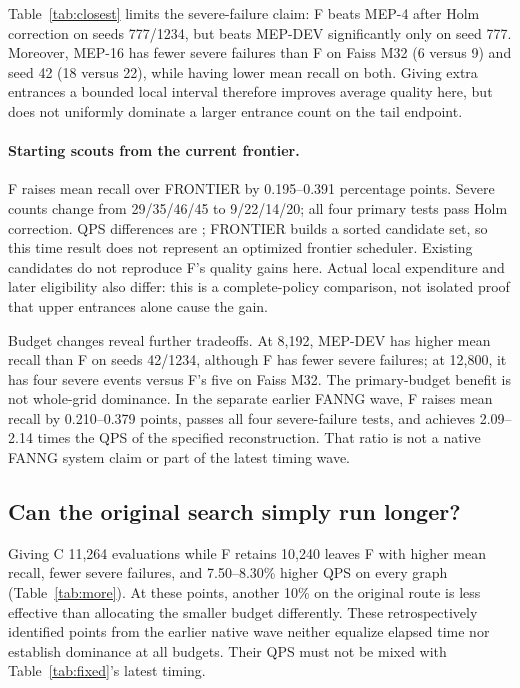 

Table~\ref{tab:closest} limits the severe-failure claim: F beats MEP-4 after Holm correction on seeds 777/1234, but beats MEP-DEV significantly only on seed 777. Moreover, MEP-16 has fewer severe failures than F on Faiss M32 (6 versus 9) and seed 42 (18 versus 22), while having lower mean recall on both. Giving extra entrances a bounded local interval therefore improves average quality here, but does not uniformly dominate a larger entrance count on the tail endpoint.

\paragraph{Starting scouts from the current frontier.}
F raises mean recall over FRONTIER by 0.195--0.391 percentage points. Severe counts change from 29/35/46/45 to 9/22/14/20; all four primary tests pass Holm correction. QPS differences are \rTwoQpsFrontier{}; FRONTIER builds a sorted candidate set, so this time result does not represent an optimized frontier scheduler. Existing candidates do not reproduce F's quality gains here. Actual local expenditure and later eligibility also differ: this is a complete-policy comparison, not isolated proof that upper entrances alone cause the gain.

Budget changes reveal further tradeoffs. At 8,192, MEP-DEV has higher mean recall than F on seeds 42/1234, although F has fewer severe failures; at 12,800, it has four severe events versus F's five on Faiss M32. The primary-budget benefit is not whole-grid dominance. In the separate earlier FANNG wave, F raises mean recall by 0.210--0.379 points, passes all four severe-failure tests, and achieves 2.09--2.14 times the QPS of the specified reconstruction. That ratio is not a native FANNG system claim or part of the latest timing wave.

\subsection{Can the original search simply run longer?}\label{sec:longer}
Giving C 11,264 evaluations while F retains 10,240 leaves F with higher mean recall, fewer severe failures, and 7.50--8.30\% higher QPS on every graph (Table~\ref{tab:more}). At these points, another 10\% on the original route is less effective than allocating the smaller budget differently. These retrospectively identified points from the earlier native wave neither equalize elapsed time nor establish dominance at all budgets. Their QPS must not be mixed with Table~\ref{tab:fixed}'s latest timing.

